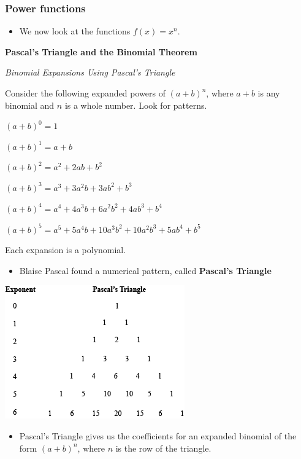\documentclass[]{book}
\providecommand{\tightlist}{%
  \setlength{\itemsep}{0pt}\setlength{\parskip}{0pt}}
\begin{document}
\hypertarget{power-functions}{%
\subsubsection{Power functions}\label{power-functions}}

\begin{itemize}
\tightlist
\item
  We now look at the functions \(f(x) = x^n\).
\end{itemize}

\textbf{Pascal's Triangle and the Binomial Theorem}

\emph{Binomial Expansions Using Pascal's Triangle}

Consider the following expanded powers of \((a + b)^n\), where \(a + b\) is any binomial and \(n\) is a whole number. Look for patterns.

\((a+b)^0 = 1\)

\((a+b)^1 = a+b\)

\((a+b)^2 = a^2+2ab+b^2\)

\((a+b)^3 = a^3+3a^2b+3ab^2+b^3\)

\((a+b)^4 = a^4+4a^3b+6a^2b^2+4ab^3+b^4\)

\((a+b)^5 = a^5+5a^4b+10a^3b^2+10a^2b^3+5ab^4+b^5\)

Each expansion is a polynomial.

\begin{itemize}
\tightlist
\item
  Blaise Pascal found a numerical pattern, called \textbf{Pascal's Triangle}
\end{itemize}

\begin{center}\includegraphics[width=0.7\linewidth]{figure/5Derivatives-12} \end{center}

\begin{itemize}
\tightlist
\item
  Pascal's Triangle gives us the coefficients for an expanded binomial of the form \((a + b)^n\), where \(n\) is the row of the triangle.
\end{itemize}
\end{document}
